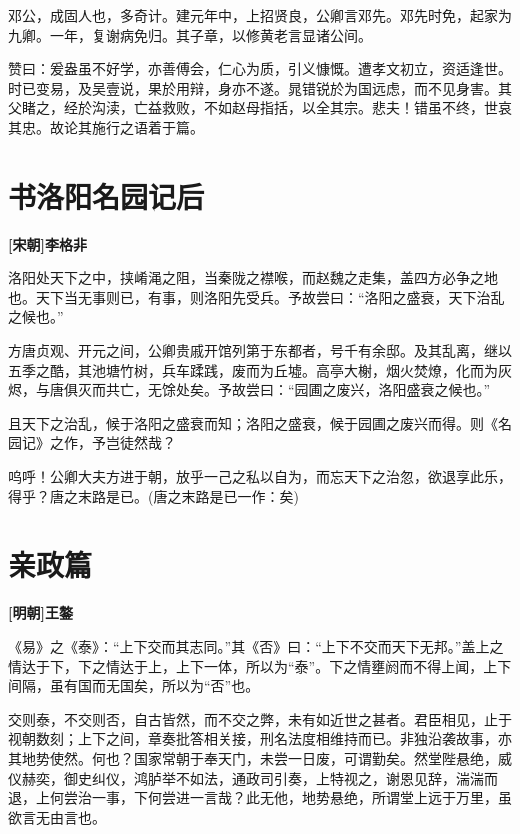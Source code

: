 \documentclass[UTF8,titlepage,oneside]{ctexbook}
\begin{document}
邓公，成固人也，多奇计。建元年中，上招贤良，公卿言邓先。邓先时免，起家为九卿。一年，复谢病免归。其子章，以修黄老言显诸公间。

赞曰：爰盎虽不好学，亦善傅会，仁心为质，引义慷慨。遭孝文初立，资适逢世。时已变易，及吴壹说，果於用辩，身亦不遂。晁错锐於为国远虑，而不见身害。其父睹之，经於沟渎，亡益救败，不如赵母指括，以全其宗。悲夫！错虽不终，世哀其忠。故论其施行之语着于篇。


\chapter*{书洛阳名园记后}
\begin{center}
	\textbf{[宋朝]李格非}
\end{center}

洛阳处天下之中，挟崤渑之阻，当秦陇之襟喉，而赵魏之走集，盖四方必争之地也。天下当无事则已，有事，则洛阳先受兵。予故尝曰：“洛阳之盛衰，天下治乱之候也。”

方唐贞观、开元之间，公卿贵戚开馆列第于东都者，号千有余邸。及其乱离，继以五季之酷，其池塘竹树，兵车蹂践，废而为丘墟。高亭大榭，烟火焚燎，化而为灰烬，与唐俱灭而共亡，无馀处矣。予故尝曰：“园圃之废兴，洛阳盛衰之候也。”

且天下之治乱，候于洛阳之盛衰而知；洛阳之盛衰，候于园圃之废兴而得。则《名园记》之作，予岂徒然哉？

呜呼！公卿大夫方进于朝，放乎一己之私以自为，而忘天下之治忽，欲退享此乐，得乎？唐之末路是已。(唐之末路是已一作：矣)


\chapter*{亲政篇}
\begin{center}
	\textbf{[明朝]王鏊}
\end{center}

《易》之《泰》：“上下交而其志同。”其《否》曰：“上下不交而天下无邦。”盖上之情达于下，下之情达于上，上下一体，所以为“泰”。下之情壅阏而不得上闻，上下间隔，虽有国而无国矣，所以为“否”也。

交则泰，不交则否，自古皆然，而不交之弊，未有如近世之甚者。君臣相见，止于视朝数刻；上下之间，章奏批答相关接，刑名法度相维持而已。非独沿袭故事，亦其地势使然。何也？国家常朝于奉天门，未尝一日废，可谓勤矣。然堂陛悬绝，威仪赫奕，御史纠仪，鸿胪举不如法，通政司引奏，上特视之，谢恩见辞，湍湍而退，上何尝治一事，下何尝进一言哉？此无他，地势悬绝，所谓堂上远于万里，虽欲言无由言也。
\end{document}
